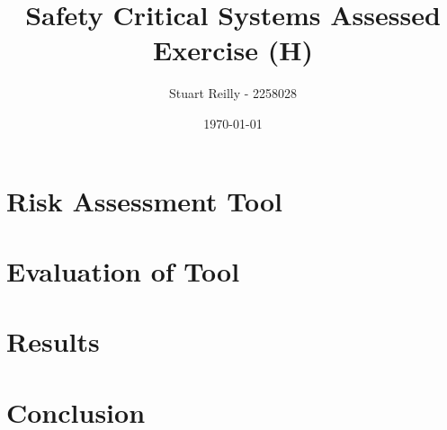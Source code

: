 \documentclass[11pt,a4]{article}
\author{Stuart Reilly - 2258028}
\title{Safety Critical Systems Assessed Exercise (H)}
\date{\today}
\begin{document}
\maketitle
\tableofcontents
{}

\section{Risk Assessment Tool}

\section{Evaluation of Tool}

\section{Results}

\section{Conclusion}
\end{document}
